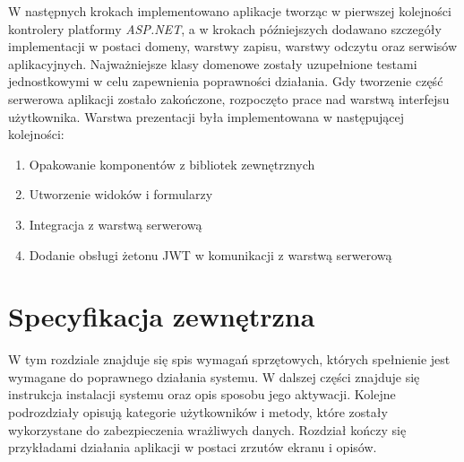 \documentclass[a4paper,twoside,12pt]{book}
\begin{document}
	W następnych krokach implementowano aplikacje tworząc w pierwszej kolejności kontrolery platformy \textit{ASP.NET}, a w krokach późniejszych dodawano szczegóły implementacji w postaci domeny, warstwy zapisu, warstwy odczytu oraz serwisów aplikacyjnych. Najważniejsze klasy domenowe zostały uzupełnione testami jednostkowymi w celu zapewnienia poprawności działania. Gdy tworzenie część serwerowa aplikacji zostało zakończone, rozpoczęto prace nad warstwą interfejsu użytkownika. Warstwa prezentacji była implementowana w następującej kolejności:
	\begin{enumerate}
		\item Opakowanie komponentów z bibliotek zewnętrznych
		\item Utworzenie widoków i formularzy
		\item Integracja z warstwą serwerową
		\item Dodanie obsługi żetonu JWT w komunikacji z warstwą serwerową
	\end{enumerate}

\chapter{Specyfikacja zewnętrzna}
W tym rozdziale znajduje się spis wymagań sprzętowych, których spełnienie jest wymagane do poprawnego działania systemu. W dalszej części znajduje się instrukcja instalacji systemu oraz opis sposobu jego aktywacji. Kolejne podrozdziały opisują kategorie użytkowników i metody, które zostały wykorzystane do zabezpieczenia wrażliwych danych. Rozdział kończy się przykładami działania aplikacji w postaci zrzutów ekranu i opisów.
\end{document}
